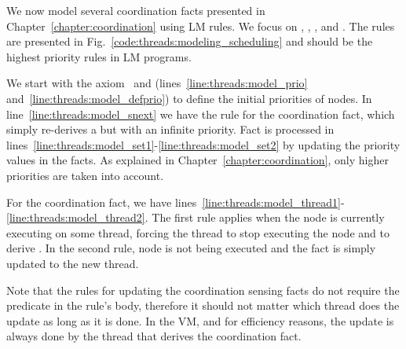 We now model several coordination facts presented in
Chapter~\ref{chapter:coordination} using LM rules. We focus on
, , , and
. The rules are presented in
Fig.~\ref{code:threads:modeling_scheduling} and should be the highest priority
rules in LM programs.

We start with the axiom~ and
(lines~\ref{line:threads:model_prio} and~\ref{line:threads:model_defprio}) to
define the initial priorities of nodes. In line~\ref{line:threads:model_snext}
we have the rule for the  coordination fact, which simply
re-derives a  but with an infinite priority. Fact
 is processed in
lines~\ref{line:threads:model_set1}-\ref{line:threads:model_set2} by updating
the priority values in the  facts. As explained in
Chapter~\ref{chapter:coordination}, only higher priorities are taken into
account.

For the  coordination fact, we have
lines~\ref{line:threads:model_thread1}-\ref{line:threads:model_thread2}. The
first rule applies when the node is currently executing on some thread, forcing
the thread to stop executing the node and to derive . In the
second rule, node  is not being executed and the  fact is
simply updated to the new thread.

Note that the rules for updating the coordination sensing facts do not require
the  predicate in the rule's body, therefore it should not matter
which thread does the update as long as it is done. In the VM, and for
efficiency reasons, the update is always done by the thread that derives the
coordination fact.

